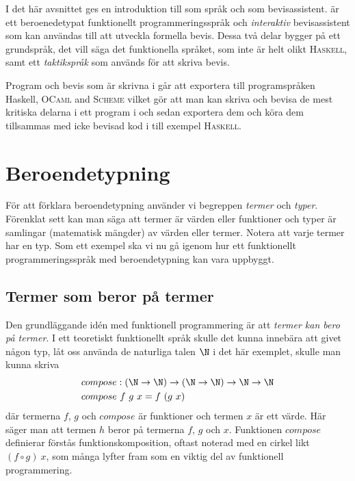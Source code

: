 I det här avsnittet ges en introduktion till \coq som språk och som
bevisassistent. \coq är ett beroenedetypat funktionellt programmeringsspråk och
\emph{interaktiv} bevisassistent som kan användas till att utveckla formella
bevis. Dessa två delar bygger på ett grundspråk, det vill säga det funktionella
språket, som inte är helt olikt \textsc{Haskell}, samt ett \emph{taktikspråk}
som används för att skriva bevis.

Program och bevis som är skrivna i \coq går att exportera till programspråken
Haskell, \textsc{OCaml} and \textsc{Scheme} vilket gör att man kan skriva och
bevisa de mest kritiska delarna i ett program i \coq och sedan exportera dem
och köra dem tillsammas med icke bevisad kod i till exempel \textsc{Haskell}.

\section{Beroendetypning}
För att förklara beroendetypning använder vi begreppen \emph{termer} och
\emph{typer}. Förenklat sett kan man säga att termer är värden eller funktioner
och typer är samlingar (matematisk mängder) av värden eller termer. Notera att
varje termer har en typ. Som ett exempel ska vi nu gå igenom hur ett
funktionellt programmeringsspråk med beroendetypning kan vara uppbyggt.

\subsection{Termer som beror på termer}
Den grundläggande idén med funktionell programmering är att \emph{termer kan
bero på termer}. I ett teoretiskt funktionellt språk skulle det kunna innebära
att givet någon typ, låt oss använda de naturliga talen $\N$ i det här
exemplet, skulle man kunna skriva
\begin{align*}
  &compose : (\N \to \N) \to (\N \to \N) \to \N \to \N \\
  &compose\ f\ g\ x = f\ (g\ x)
\end{align*}
där termerna $f$, $g$ och $compose$ är funktioner och termen $x$ är ett värde. Här
säger man att termen $h$ beror på termerna $f$, $g$ och $x$. Funktionen
$compose$ definierar förstås funktionskomposition, oftast noterad med en cirkel
likt $(f \circ g)\ x$, som många lyfter fram som en viktig del av funktionell
programmering.


